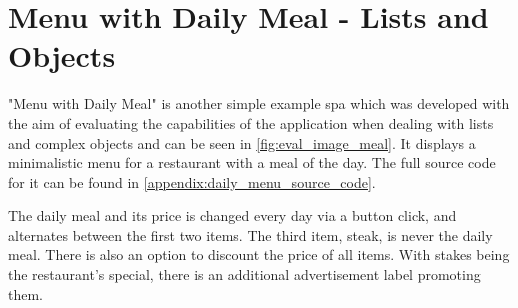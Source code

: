 \section{Menu with Daily Meal - Lists and Objects}
"Menu with Daily Meal" is another simple example \gls{spa} which was developed with the aim of evaluating the capabilities of the application when dealing with lists and complex objects and can be seen in \ref{fig:eval_image_meal}. It displays a minimalistic menu for a restaurant with a meal of the day. The full source code for it can be found in \ref{appendix:daily_menu_source_code}.

The daily meal and its price is changed every day via a button click, and alternates between the first two items. The third item, steak, is never the daily meal. There is also an option to discount the price of all items. With stakes being the restaurant's special, there is an additional advertisement label promoting them.
